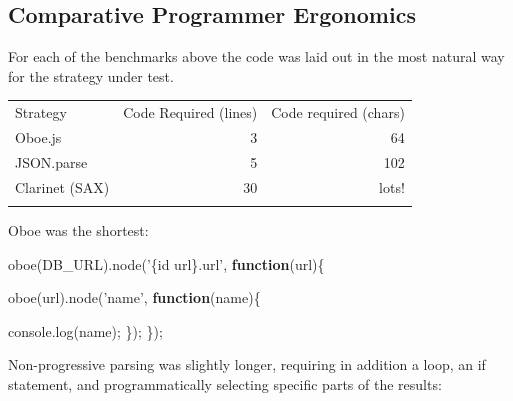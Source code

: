 \documentclass[]{article}
\newenvironment{Shaded}{}{}
\newcommand{\KeywordTok}[1]{\textcolor[rgb]{0.00,0.44,0.13}{\textbf{{#1}}}}
\newcommand{\StringTok}[1]{\textcolor[rgb]{0.25,0.44,0.63}{{#1}}}
\newcommand{\OtherTok}[1]{\textcolor[rgb]{0.00,0.44,0.13}{{#1}}}
\newcommand{\FunctionTok}[1]{\textcolor[rgb]{0.02,0.16,0.49}{{#1}}}
\newcommand{\NormalTok}[1]{{#1}}
\begin{document}
\subsection{Comparative Programmer Ergonomics}

For each of the benchmarks above the code was laid out in the most
natural way for the strategy under test.

\begin{longtable}[c]{@{}lrr@{}}
\hline\noalign{\medskip}
Strategy & Code Required (lines) & Code required (chars)
\\\noalign{\medskip}
\hline\noalign{\medskip}
Oboe.js & 3 & 64
\\\noalign{\medskip}
JSON.parse & 5 & 102
\\\noalign{\medskip}
Clarinet (SAX) & 30 & lots!
\\\noalign{\medskip}
\hline
\end{longtable}

Oboe was the shortest:

\begin{Shaded}
\begin{Highlighting}[]
\FunctionTok{oboe}\NormalTok{(DB_URL).}\FunctionTok{node}\NormalTok{(}\StringTok{'\{id url\}.url'}\NormalTok{, }\KeywordTok{function}\NormalTok{(url)\{}
        
   \FunctionTok{oboe}\NormalTok{(url).}\FunctionTok{node}\NormalTok{(}\StringTok{'name'}\NormalTok{, }\KeywordTok{function}\NormalTok{(name)\{}
                   
      \OtherTok{console}\NormalTok{.}\FunctionTok{log}\NormalTok{(name);               }
   \NormalTok{\});      }
\NormalTok{\});}
\end{Highlighting}
\end{Shaded}

Non-progressive parsing was slightly longer, requiring in addition a
loop, an if statement, and programmatically selecting specific parts of
the results:
\end{document}
